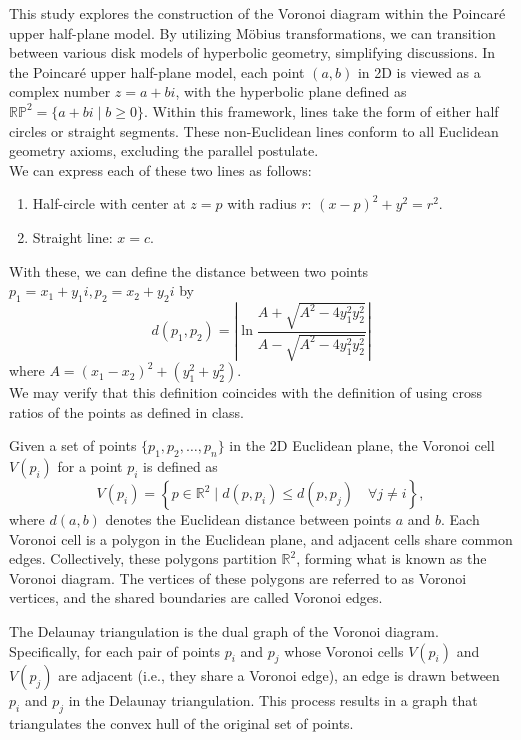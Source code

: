 \documentclass[minted, draw]{hebdomon}
\newcommand{\RP}{{\mathbb{R}\mathbb{P} }}
\begin{document}
This study explores the construction of the Voronoi diagram within the Poincaré upper half-plane model. By utilizing Möbius transformations, we can transition between various disk models of hyperbolic geometry, simplifying discussions. In the Poincaré upper half-plane model, each point $(a, b)$ in 2D is viewed as a complex number $z = a + bi$, with the hyperbolic plane defined as $\RP^2 = \{a+bi \mid b \ge 0\}$. Within this framework, lines take the form of either half circles or straight segments. These non-Euclidean lines conform to all Euclidean geometry axioms, excluding the parallel postulate. \\

We can express each of these two lines as follows:
\begin{enumerate}
    \item Half-circle with center at $z = p$ with radius $r$: $(x-p)^2 + y^2 = r^2$.
    \item Straight line: $x = c$. 
\end{enumerate}

With these, we can define the distance between two points $p_1 = x_1 + y_1i, p_2 = x_2 + y_2i$ by
\[
    d(p_1, p_2) = \left |  \ln \dfrac{A + \sqrt{A^2 - 4y_1^2y_2^2}}{A - \sqrt{A^2 - 4y_1^2y_2^2}} \right |
\]
where $A = (x_1-x_2)^2 + (y_1^2+y_2^2)$. \\

We may verify that this definition coincides with the definition of using cross ratios of the points as defined in class.


Given a set of points $\{p_1, p_2, \dots, p_n\}$ in the 2D Euclidean plane, the Voronoi cell $V(p_i)$ for a point $p_i$ is defined as
\[
V(p_i) = \left\{ p \in \mathbb{R}^2 \;\bigg|\; d(p, p_i) \leq d(p, p_j) \quad \forall j \neq i \right\},
\]
where $d(a, b)$ denotes the Euclidean distance between points $a$ and $b$. Each Voronoi cell is a polygon in the Euclidean plane, and adjacent cells share common edges. Collectively, these polygons partition $\mathbb{R}^2$, forming what is known as the Voronoi diagram. The vertices of these polygons are referred to as Voronoi vertices, and the shared boundaries are called Voronoi edges.


The Delaunay triangulation is the dual graph of the Voronoi diagram. Specifically, for each pair of points $p_i$ and $p_j$ whose Voronoi cells $V(p_i)$ and $V(p_j)$ are adjacent (i.e., they share a Voronoi edge), an edge is drawn between $p_i$ and $p_j$ in the Delaunay triangulation. This process results in a graph that triangulates the convex hull of the original set of points. 
\end{document}
